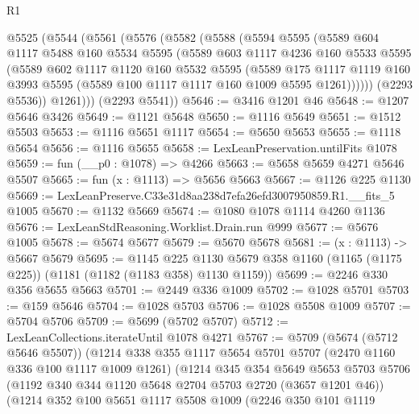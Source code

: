 \begin{lexlean}{R1}
\begin{coremodule}
  @5525
    (@5544
      (@5561
        (@5576
          (@5582
            (@5588
              (@5594
                @5595
                (@5589
                  @604
                  @1117
                  @5488
                  @160
                  @5534
                  @5595
                  (@5589
                    @603
                    @1117
                    @4236
                    @160
                    @5533
                    @5595
                    (@5589
                      @602
                      @1117
                      @1120
                      @160
                      @5532
                      @5595
                      (@5589
                        @175
                        @1117
                        @1119
                        @160
                        @3993
                        @5595
                        (@5589 @100 @1117 @1117 @160 @1009 @5595 @1261))))))
              (@2293 @5536))
            @1261)))
      (@2293 @5541))
@5646 := @3416 @1201 @46
@5648 := @1207 @5646 @3426
@5649 := @1121 @5648
@5650 := @1116 @5649
@5651 := @1512 @5503
@5653 := @1116 @5651 @1117
@5654 := @5650 @5653
@5655 := @1118 @5654
@5656 := @1116 @5655
@5658 := LexLeanPreservation.untilFits @1078
@5659 := fun (__p0 : @1078) => @4266
@5663 := @5658 @5659 @4271 @5646 @5507
@5665 := fun (x : @1113) => @5656 @5663
@5667 := @1126 @225 @1130
@5669 := LexLeanPreserve.C33e31d8aa238d7efa26efd3007950859.R1.__fits_5 @1005
@5670 := @1132 @5669
@5674 := @1080 @1078 @1114 @4260 @1136
@5676 := LexLeanStdReasoning.Worklist.Drain.run @999
@5677 := @5676 @1005
@5678 := @5674 @5677
@5679 := @5670 @5678
@5681 := (x : @1113) -> @5667 @5679
@5695 := @1145
    @225
    @1130
    @5679
    @358
    @1160
    (@1165 (@1175 @225))
    (@1181 (@1182 (@1183 @358) @1130 @1159))
@5699 := @2246 @330 @356 @5655 @5663
@5701 := @2449 @336 @1009
@5702 := @1028 @5701
@5703 := @159 @5646
@5704 := @1028 @5703
@5706 := @1028 @5508 @1009
@5707 := @5704 @5706
@5709 := @5699 (@5702 @5707)
@5712 := LexLeanCollections.iterateUntil @1078 @4271
@5767 := @5709
    (@5674 (@5712 @5646 @5507))
    (@1214
      @338
      @355
      @1117
      @5654
      @5701
      @5707
      (@2470 @1160 @336 @100 @1117 @1009 @1261)
      (@1214
        @345
        @354
        @5649
        @5653
        @5703
        @5706
        (@1192 @340 @344 @1120 @5648 @2704 @5703 @2720 (@3657 @1201 @46))
        (@1214
          @352
          @100
          @5651
          @1117
          @5508
          @1009
          (@2246
            @350
            @101
            @1119

\end{coremodule}
\end{lexlean}
